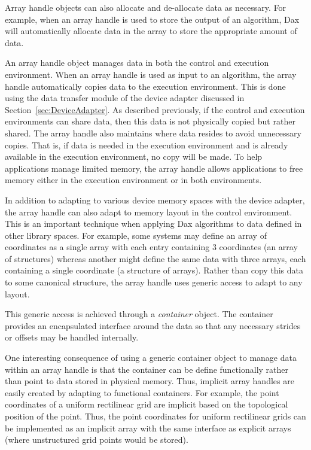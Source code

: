 \documentclass[conference]{IEEEtran}
\newcommand*{\keyterm}[1]{\emph{#1}}
\begin{document}
Array handle objects can also allocate and de-allocate data as necessary.
For example, when an array handle is used to store the output of an
algorithm, Dax will automatically allocate data in the array to store the
appropriate amount of data.

An array handle object manages data in both the control and execution
environment.  When an array handle is used as input to an algorithm, the
array handle automatically copies data to the execution environment.  This
is done using the data transfer module of the device adapter discussed in
Section~\ref{sec:DeviceAdapter}.  As described previously, if the control
and execution environments can share data, then this data is not physically
copied but rather shared.  The array handle also maintains where data
resides to avoid unnecessary copies.  That is, if data is needed in the
execution environment and is already available in the execution environment,
no copy will be made.  To help applications manage limited memory, the
array handle allows applications to free memory either in the execution
environment or in both environments.

In addition to adapting to various device memory spaces with the device
adapter, the array handle can also adapt to memory layout in the control
environment.  This is an important technique when applying Dax algorithms
to data defined in other library spaces.  For example, some systems may
define an array of coordinates as a single array with each entry containing
3 coordinates (an array of structures) whereas another might define the
same data with three arrays, each containing a single coordinate (a
structure of arrays).  Rather than copy this data to some canonical
structure, the array handle uses generic access to adapt to any layout.

This generic access is achieved through a \keyterm{container} object.  The
container provides an encapsulated interface around the data so that any
necessary strides or offsets may be handled internally.

One interesting consequence of using a generic container object to manage
data within an array handle is that the container can be define
functionally rather than point to data stored in physical memory.  Thus,
implicit array handles are easily created by adapting to functional
containers.  For example, the point coordinates of a uniform rectilinear
grid are implicit based on the topological position of the point.  Thus,
the point coordinates for uniform rectilinear grids can be implemented as
an implicit array with the same interface as explicit arrays (where
unstructured grid points would be stored).
\end{document}
